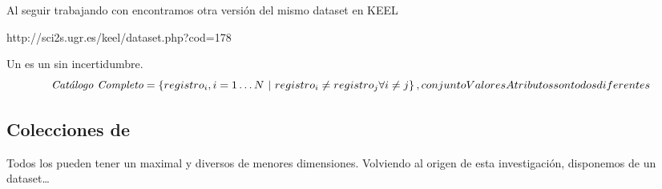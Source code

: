 \ABIERTO
Al seguir trabajando con \mushroom encontramos otra versión del mismo dataset en KEEL

http://sci2s.ugr.es/keel/dataset.php?cod=178


\begin{Definition}[\CC] Un \CC es un \catalogo sin incertidumbre.
   $$\CC = \left\{registro_i, i = 1\ldots N\ | \ registro_i \neq registro_j \forall i \neq j\right\},  conjuntoValoresAtributos son todos diferentes$$
\label{def:catalogo}
\end{Definition}






\subsection{Colecciones de \CCs}
\label{sec:clasificacion:catalogo-comprimido:colecciones}
%

Todos los \CCs pueden tener un \CC maximal y diversos \CCs de menores dimensiones. Volviendo al origen de esta investigación, disponemos de un dataset\ldots
